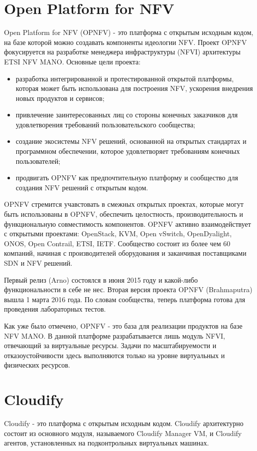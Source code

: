 \documentclass[oneside,final,14pt,a4paper]{extreport}
\begin{document}
\section{Open Platform for NFV}
Open Platform for NFV (OPNFV) - это платформа с открытым исходным кодом, на базе которой можно создавать компоненты  идеологии NFV. Проект OPNFV фокусируется на разработке менеджера инфраструктуры (NFVI) архитектуры ETSI NFV MANO\cite{opnfv-official}. Основные цели проекта:
\begin{itemize}
	\item разработка интегрированной и протестированной открытой платформы, которая может быть использована для построения NFV, ускорения внедрения новых продуктов и сервисов;
	\item привлечение заинтересованных лиц со стороны конечных заказчиков для удовлетворения требований пользовательского сообщества;
	\item создание экосистемы NFV решений, основанной на открытых стандартах и программном обеспечении, которое удовлетворяет требованиям конечных пользователей;
	\item продвигать OPNFV как предпочтительную платформу и сообщество для создания NFV решений с открытым кодом.
\end{itemize}

OPNFV стремится учавстовать в смежных открытых проектах, которые могут быть использованы в OPNFV, обеспечить целостность, производительность и функциональную совместимость компонентов. OPNFV активно взаимодействует с открытыми проектами: OpenStack, KVM, Open vSwitch, OpenDyalight, ONOS, Open Contrail, ETSI, IETF. Сообщество состоит из более чем 60 компаний, начиная с производителей оборудования и заканчивая поставщиками SDN и NFV решений.\cite{opnfv-state1}

Первый релиз (Arno) состоялся в июня 2015 году и какой-либо функциональности в себе не нес. Вторая версия проекта OPNFV (Brahmaputra) вышла 1 марта 2016 года. По словам сообщества, теперь платформа готова для проведения лабораторных тестов.

Как уже было отмечено, OPNFV - это база для реализации продуктов на базе NFV MANO. В данной платформе разрабатывается лишь модуль NFVI, отвечающий за виртуальные ресурсы. Задачи по масштабируемости и отказоустойчивости здесь выполняются только на уровне виртуальных и физических ресурсов.


\section{Cloudify}
Cloudify - это платформа с открытым исходным кодом. Cloudify архитектурно состоит из основного модуля, называемого Cloudify Manager VM, и Cloudify агентов, установленных на подконтрольных виртуальных машинах. 
\end{document}
